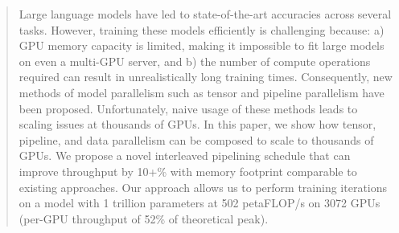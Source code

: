 \begin{abstract}

Large language models have led to state-of-the-art accuracies across several tasks. However, training these models efficiently is challenging because: a) GPU memory capacity is limited, making it impossible to fit large models on even a multi-GPU server, and b) the number of compute operations required can result in unrealistically long training times. Consequently, new methods of model parallelism such as tensor and pipeline parallelism have been proposed. Unfortunately, naive usage of these methods leads to scaling issues at thousands of GPUs. In this paper, we show how tensor, pipeline, and data parallelism can be composed to scale to thousands of GPUs. We propose a novel interleaved pipelining schedule that can improve throughput by 10+\% with memory footprint comparable to existing approaches. Our approach allows us to perform training iterations on a model with 1 trillion parameters at 502 petaFLOP/s on 3072 GPUs (per-GPU throughput of 52\% of theoretical peak).

\end{abstract}